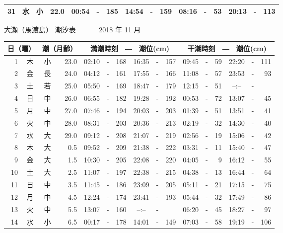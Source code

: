 \documentclass[12pt.a4j]{jsarticle}
\begin{document}
\begin{center}
\begin{table}[ht]
\begin{tabular}{|rc|cr|ccrccr|ccrccr|}
31 & 水 & 小 & 22.0 &  00:54 &-& 185  &  14:54 &-& 159  &   08:16 &-&  53  &   20:13 &-& 113  \\
   \hline
   \end{tabular}
\end{table}
\newpage
 {\LARGE 大瀬（馬渡島）  潮汐表　　　}
 {\large 2018 年 11 月}\\
 \begin{table}[ht]
    \begin{tabular}{|rc|cr|ccrccr|ccrccr|}
    \hline
    \multicolumn{2}{|c|}{日（曜）} & \multicolumn{2}{c|}{潮（月齢）} & \multicolumn{6}{c|}{満潮時刻　―　潮位(cm)} & \multicolumn{6}{c|}{干潮時刻　―　潮位(cm)} \\
 \hline
 1 & 木 & 小 & 23.0 &  02:10 &-& 168  &  16:35 &-& 157  &   09:45 &-&  59  &   22:20 &-& 111  \\
 2 & 金 & 長 & 24.0 &  04:12 &-& 161  &  17:55 &-& 166  &   11:08 &-&  57  &   23:53 &-&  93  \\
 3 & 土 & 若 & 25.0 &  05:50 &-& 169  &  18:47 &-& 179  &   12:15 &-&  51  &   --:-- &-&     \\
 4 & 日 & 中 & 26.0 &  06:55 &-& 182  &  19:28 &-& 192  &   00:53 &-&  72  &   13:07 &-&  45  \\
 5 & 月 & 中 & 27.0 &  07:46 &-& 194  &  20:03 &-& 203  &   01:39 &-&  51  &   13:51 &-&  41  \\
 6 & 火 & 中 & 28.0 &  08:31 &-& 203  &  20:36 &-& 213  &   02:19 &-&  32  &   14:30 &-&  40  \\
 7 & 水 & 大 & 29.0 &  09:12 &-& 208  &  21:07 &-& 219  &   02:56 &-&  19  &   15:06 &-&  42  \\
 8 & 木 & 大 &  0.5 &  09:52 &-& 209  &  21:38 &-& 222  &   03:31 &-&  11  &   15:40 &-&  47  \\
 9 & 金 & 大 &  1.5 &  10:30 &-& 205  &  22:08 &-& 220  &   04:05 &-&   9  &   16:12 &-&  55  \\
10 & 土 & 大 &  2.5 &  11:07 &-& 197  &  22:38 &-& 215  &   04:38 &-&  13  &   16:44 &-&  64  \\
11 & 日 & 中 &  3.5 &  11:45 &-& 186  &  23:09 &-& 205  &   05:11 &-&  21  &   17:15 &-&  75  \\
12 & 月 & 中 &  4.5 &  12:24 &-& 174  &  23:41 &-& 193  &   05:44 &-&  32  &   17:49 &-&  86  \\
13 & 火 & 中 &  5.5 &  13:07 &-& 160  &  --:-- &-&     &   06:20 &-&  45  &   18:27 &-&  97  \\
14 & 水 & 小 &  6.5 &  00:17 &-& 178  &  14:01 &-& 149  &   07:03 &-&  58  &   19:19 &-& 106  \\

\end{tabular}
\end{table}
\end{center}
\end{document}
